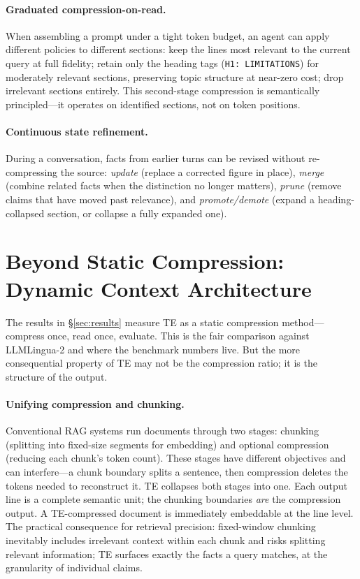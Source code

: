 \documentclass{article}
\begin{document}
\paragraph{Graduated compression-on-read.} When assembling a prompt under a tight token budget, an agent can apply different policies to different sections: keep the lines most relevant to the current query at full fidelity; retain only the heading tags (\texttt{H1: LIMITATIONS}) for moderately relevant sections, preserving topic structure at near-zero cost; drop irrelevant sections entirely. This second-stage compression is semantically principled---it operates on identified sections, not on token positions.

\paragraph{Continuous state refinement.} During a conversation, facts from earlier turns can be revised without re-compressing the source: \emph{update} (replace a corrected figure in place), \emph{merge} (combine related facts when the distinction no longer matters), \emph{prune} (remove claims that have moved past relevance), and \emph{promote/demote} (expand a heading-collapsed section, or collapse a fully expanded one).

\section{Beyond Static Compression: Dynamic Context Architecture}
\label{app:dynamic}

The results in \S\ref{sec:results} measure TE as a static compression method---compress once, read once, evaluate. This is the fair comparison against LLMLingua-2 and where the benchmark numbers live. But the more consequential property of TE may not be the compression ratio; it is the structure of the output.

\paragraph{Unifying compression and chunking.}
Conventional RAG systems run documents through two stages: chunking (splitting into fixed-size segments for embedding) and optional compression (reducing each chunk's token count). These stages have different objectives and can interfere---a chunk boundary splits a sentence, then compression deletes the tokens needed to reconstruct it. TE collapses both stages into one. Each output line is a complete semantic unit; the chunking boundaries \emph{are} the compression output. A TE-compressed document is immediately embeddable at the line level. The practical consequence for retrieval precision: fixed-window chunking inevitably includes irrelevant context within each chunk and risks splitting relevant information; TE surfaces exactly the facts a query matches, at the granularity of individual claims.
\end{document}
